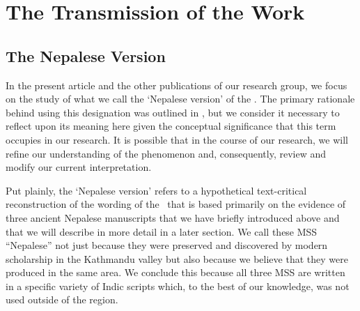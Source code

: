 \section{The Transmission of the Work}
\subsection{The Nepalese Version}

In the present article and the other publications of our research group, we focus on the study 
of what we call the `Nepalese version' of the \SS. The primary rationale behind using this 
designation was outlined in \citet[2--3]{kleb-2021b}, but we consider it necessary to 
reflect upon its meaning here given the conceptual significance that this term occupies in our 
research.
It is possible that in the course of our research, we will refine our understanding of the 
phenomenon and, consequently, review and modify our current interpretation.%

Put plainly, the `Nepalese version' refers to a hypothetical text-critical reconstruction of the 
wording of the \SS\ that is based primarily on the evidence of three ancient Nepalese 
manuscripts that we have briefly introduced above and that we will describe in more detail in 
a later section.  We call these MSS “Nepalese” not just because they were preserved and 
discovered by modern scholarship 
in the 
Kathmandu valley
but also because we believe that they were produced in the same area. We conclude this 
because all three MSS are written in a specific variety of Indic scripts which, to the best of our 
knowledge, was not used outside of the region. 

